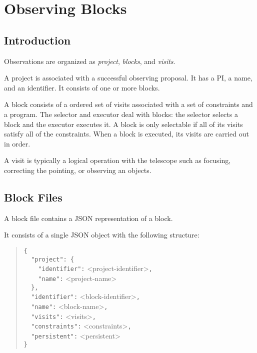 \chapter{Observing Blocks}

\section{Introduction}

Observations are organized as \emph{project}, \emph{blocks}, and \emph{visits}.

A project is associated with a successful observing proposal. It has a PI, a name, and an identifier. It consists of one or more blocks.

A block consists of a ordered set of visits associated with a set of constraints and a program. The selector and executor deal with blocks: the selector selects a block and the executor executes it. A block is only selectable if all of its visits satisfy all of the constraints. When a block is executed, its visits are carried out in order.

A visit is typically a logical operation with the telescope such as focusing, correcting the pointing, or observing an objects.

\section{Block Files}

A block file contains a JSON representation of a block.

It consists of a single JSON object with the following structure:
\begin{quote}
\verb|{|\\
\verb|  "project": {|\\
\verb|    "identifier":| <project-identifier>\verb|,|\\
\verb|    "name":| <project-name>\\
\verb|  },|\\
\verb|  "identifier":| <block-identifier>\verb|,|\\
\verb|  "name":| <block-name>\verb|,|\\
\verb|  "visits":| <visits>\verb|,|\\
\verb|  "constraints":| <constraints>\verb|,|\\
\verb|  "persistent":| <persistent>\\
\verb|}|
\end{quote}

